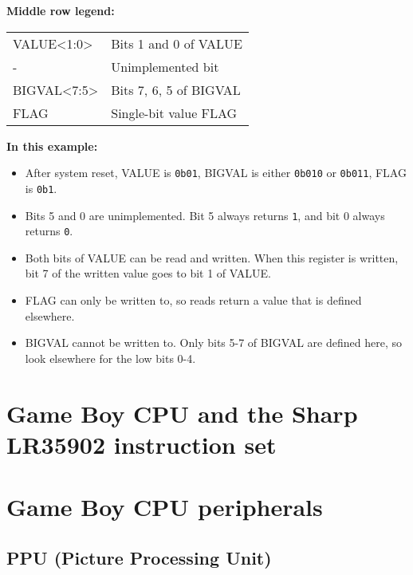\documentclass[a4paper, draft, oneside]{memoir}
\newcommand{\bit}[1]{\texttt{#1}}
\newcommand{\bin}[1]{\texttt{0b#1}}
\begin{document}
\begin{register}[H]
  \textbf{Middle row legend:} \\
  {
    \ttfamily
    \begin{tabu} to 0.5\textwidth {|X[l]|X[c]|}
      \everyrow{\hline}
      \hline
      VALUE<1:0> & \rmfamily Bits 1 and 0 of VALUE \\
       - & \rmfamily Unimplemented bit \\
      BIGVAL<7:5> & \rmfamily Bits 7, 6, 5 of BIGVAL \\
      FLAG & \rmfamily Single-bit value FLAG \\
      \hline
    \end{tabu}
  }

  \vspace{3mm}
  \textbf{In this example:}
  \begin{itemize}
    \item{After system reset, VALUE is \bin{01}, BIGVAL is either \bin{010} or \bin{011}, FLAG is \bin{1}.}
    \item{Bits 5 and 0 are unimplemented. Bit 5 always returns \bit{1}, and bit 0 always returns \bit{0}.}
    \item{Both bits of VALUE can be read and written. When this register is written, bit 7 of the written value goes to bit 1 of VALUE.}
    \item{FLAG can only be written to, so reads return a value that is defined elsewhere.}
    \item{BIGVAL cannot be written to. Only bits 5-7 of BIGVAL are defined here, so look elsewhere for the low bits 0-4.}
  \end{itemize}
\end{register}

\part{Game Boy CPU and the Sharp LR35902 instruction set}

\part{Game Boy CPU peripherals}

\chapter{PPU (Picture Processing Unit)}
\end{document}
